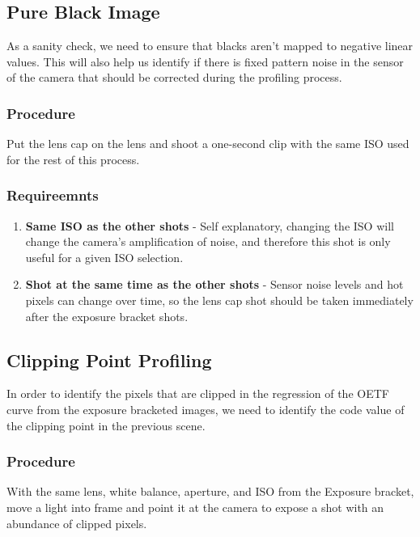 \documentclass[twoside]{article}
\begin{document}
\subsection{Pure Black Image}
As a sanity check, we need to ensure that blacks aren't mapped to negative linear values. This will also help us identify if there is fixed pattern noise in the sensor of the camera that should be corrected during the profiling process.

\subsubsection{Procedure}
Put the lens cap on the lens and shoot a one-second clip with the same ISO used for the rest of this process.

\subsubsection{Requireemnts}
\begin{enumerate}
    \item \textbf{Same ISO as the other shots} - Self explanatory, changing the ISO will change the camera's amplification of noise, and therefore this shot is only useful for a given ISO selection.
    \item \textbf{Shot at the same time as the other shots} - Sensor noise levels and hot pixels can change over time, so the lens cap shot should be taken immediately after the exposure bracket shots.
\end{enumerate}


\subsection{Clipping Point Profiling}
In order to identify the pixels that are clipped in the regression of the OETF curve from the exposure bracketed images, we need to identify the code value of the clipping point in the previous scene.

\subsubsection{Procedure}
With the same lens, white balance, aperture, and ISO from the Exposure bracket, move a light into frame and point it at the camera to expose a shot with an abundance of clipped pixels.
\end{document}

